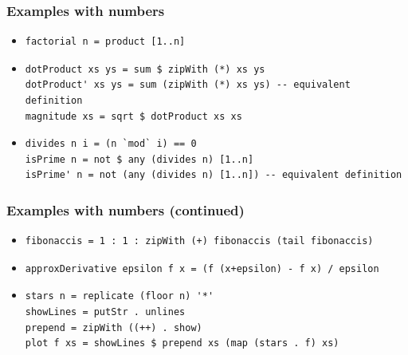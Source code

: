 \documentclass{beamer}
\begin{document}
\begin{frame}[fragile]
\frametitle{Examples with numbers}
\begin{itemize}
\item
\begin{Verbatim}[frame=single, fontsize=\scriptsize]
factorial n = product [1..n]
\end{Verbatim}
\item
\begin{Verbatim}[frame=single, fontsize=\scriptsize]
dotProduct xs ys = sum $ zipWith (*) xs ys
dotProduct' xs ys = sum (zipWith (*) xs ys) -- equivalent definition
magnitude xs = sqrt $ dotProduct xs xs
\end{Verbatim}
\item
\begin{Verbatim}[frame=single, fontsize=\scriptsize]
divides n i = (n `mod` i) == 0
isPrime n = not $ any (divides n) [1..n]
isPrime' n = not (any (divides n) [1..n]) -- equivalent definition
\end{Verbatim}
\end{itemize}
\end{frame}

\begin{frame}[fragile]
\frametitle{Examples with numbers (continued)}
\begin{itemize}
\item
\begin{Verbatim}[frame=single, fontsize=\scriptsize]
fibonaccis = 1 : 1 : zipWith (+) fibonaccis (tail fibonaccis)
\end{Verbatim}
\item
\begin{Verbatim}[frame=single, fontsize=\scriptsize]
approxDerivative epsilon f x = (f (x+epsilon) - f x) / epsilon
\end{Verbatim}
\item
\begin{Verbatim}[frame=single, fontsize=\scriptsize]
stars n = replicate (floor n) '*'
showLines = putStr . unlines
prepend = zipWith ((++) . show)
plot f xs = showLines $ prepend xs (map (stars . f) xs)
\end{Verbatim}
\end{itemize}
\end{frame}
\end{document}
